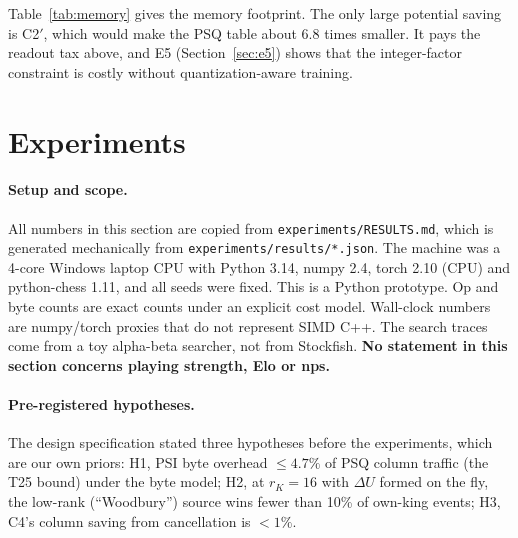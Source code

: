 Table~\ref{tab:memory} gives the memory footprint.
The only large potential saving is C2$'$, which would make the PSQ table about 6.8 times smaller.
It pays the readout tax above, and E5 (Section~\ref{sec:e5}) shows that the integer-factor constraint is costly without quantization-aware training.

\section{Experiments}\label{sec:experiments}

\paragraph{Setup and scope.}
All numbers in this section are copied from \texttt{experiments/RESULTS.md}, which is generated mechanically from \texttt{experiments/results/*.json}.
The machine was a 4-core Windows laptop CPU with Python 3.14, numpy 2.4, torch 2.10 (CPU) and python-chess 1.11, and all seeds were fixed.
This is a Python prototype.
Op and byte counts are exact counts under an explicit cost model.
Wall-clock numbers are numpy/torch proxies that do not represent SIMD C++.
The search traces come from a toy alpha-beta searcher, not from Stockfish.
\textbf{No statement in this section concerns playing strength, Elo or nps.}

\paragraph{Pre-registered hypotheses.}
The design specification stated three hypotheses before the experiments, which are our own priors:
H1, PSI byte overhead $\le4.7\%$ of PSQ column traffic (the T25 bound) under the byte model;
H2, at $r_K=16$ with $\Delta U$ formed on the fly, the low-rank (``Woodbury'') source wins fewer than 10\% of own-king events;
H3, C4's column saving from cancellation is $<1\%$.

